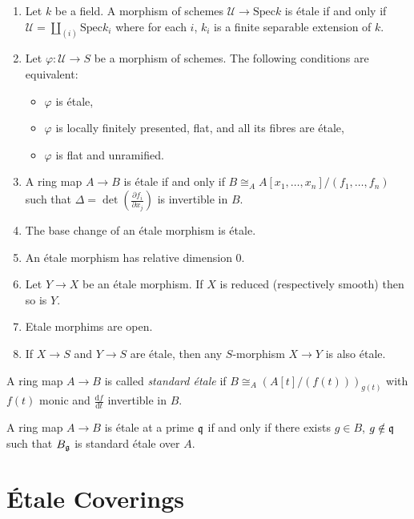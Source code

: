 \begin{proposition} $ $ \label{prop:ofEtaleMorphisms}
\begin{enumerate}
\item
Let $k$ be a field. A morphism of schemes $\mathcal{U} \to \text{Spec} k$ is 
\'etale if and only if $\mathcal{U} = \coprod_{(i)} \text{Spec} k_i$ where for 
each $i$, $k_i$ is a finite separable extension of $k$.
\item
Let $\varphi : \mathcal{U} \to S$ be a morphism of schemes. The following 
conditions are equivalent:  
\begin{itemize}
\item $\varphi$ is \'etale,
\item $\varphi$ is locally finitely presented, flat, and all its fibres are 
\'etale,
\item $\varphi$ is flat and unramified.
\end{itemize}
\item
A ring map $A \to B$ is \'etale if and only if $B \cong_A A[x_1, 
\dots,x_n]/(f_1,\dots,f_n)$ such that $\Delta = \det \left( \frac{\partial 
f_i}{\partial x_j} \right) $ is invertible in $B$.
\item
The base change of an \'etale morphism is \'etale.
\item
An \'etale morphism has relative dimension 0.
\item
Let $Y \to X$ be an \'etale morphism. If  $X$ is reduced (respectively smooth) 
then so is $Y$.
\item 
Etale morphims are open.
\item
If $X\to S$ and $Y\to S$ are \'etale, then any $S$-morphism $X \to Y$ is also 
\'etale.
\end{enumerate}
\end{proposition}

\begin{definition}
A ring map $A \to B$ is called \emph{standard \'etale} if $B \cong_A \left( 
A[t]/(f(t)) \right)_{g(t)}$ with $f(t)$ monic and 
$\frac{\mathrm{d}f}{\mathrm{d}t}$ invertible in $B$.
\end{definition}

\begin{theorem}
A ring map $A \to B$ is \'etale at a prime $\frak q$ if and only if there 
exists $g \in B$, $g \notin \frak q$ such that $B_{\frak g}$ is standard 
\'etale over $A$.
\end{theorem}

\section{\'Etale Coverings}


